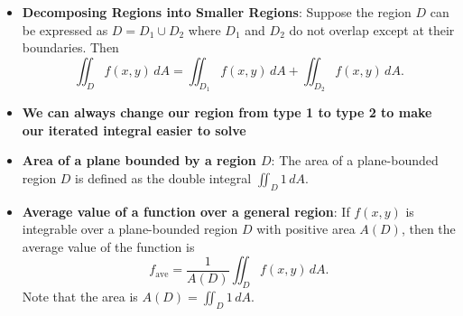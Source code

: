 \documentclass{report}
\begin{document}
\begin{itemize}
\begin{equation}
            \end{equation}
        \item \textbf{Decomposing Regions into Smaller Regions}:
            Suppose the region \(D\) can be expressed as \(D = D_1 \cup D_2\) where \(D_1\) and \(D_2\) do not overlap except at their boundaries. Then
            \[
                \iint_{D} f(x,y) \, dA = \iint_{D_1} f(x,y) \, dA + \iint_{D_2} f(x,y) \, dA.
            \]
        \item \textbf{We can always change our region from type 1 to type 2 to make our iterated integral easier to solve}
        \item \textbf{Area of a plane bounded by a region $D$}:
            The area of a plane-bounded region \(D\) is defined as the double integral \(\iint_{D} 1 \, dA\).
        \item \textbf{Average value of a function over a general region}:
            If \(f(x,y)\) is integrable over a plane-bounded region \(D\) with positive area \(A(D)\), then the average value of the function is
            \[
                f_{\text{ave}} = \frac{1}{A(D)} \iint_{D} f(x,y) \, dA.
            \]
            Note that the area is \(A(D) = \iint_{D} 1 \, dA\).






 






    \end{itemize}
\end{document}
